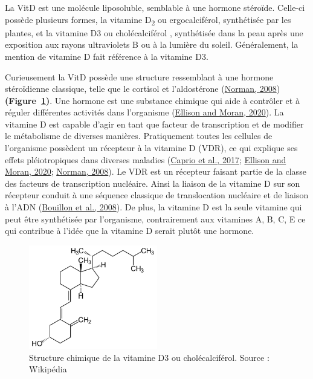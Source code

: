 \documentclass[
  letterpaper,
  DIV=11,
  numbers=noendperiod]{scrartcl}
\begin{document}
La VitD est une molécule liposoluble, semblable à une hormone stéroïde.
Celle-ci possède plusieurs formes, la vitamine D\textsubscript{2} ou
ergocalciférol, synthétisée par les plantes, et la vitamine D3 ou
cholécalciférol , synthétisée dans la peau après une exposition aux
rayons ultraviolets B ou à la lumière du soleil. Généralement, la
mention de vitamine D fait référence à la vitamine D3.

Curieusement la VitD possède une structure ressemblant à une hormone
stéroïdienne classique, telle que le cortisol et l'aldostérone
(\protect\hyperlink{ref-Norman.2008}{Norman, 2008})
\textbf{(Figure~\ref{fig-vitd3})}. Une hormone est une substance
chimique qui aide à contrôler et à réguler différentes activités dans
l'organisme (\protect\hyperlink{ref-Ellison.2020}{Ellison and Moran,
2020}). La vitamine D est capable d'agir en tant que facteur de
transcription et de modifier le métabolisme de diverses manières.
Pratiquement toutes les cellules de l'organisme possèdent un récepteur à
la vitamine D (VDR), ce qui explique ses effets pléiotropiques dans
diverses maladies (\protect\hyperlink{ref-Caprio.2017}{Caprio et al.,
2017}; \protect\hyperlink{ref-Ellison.2020}{Ellison and Moran, 2020};
\protect\hyperlink{ref-Norman.2008}{Norman, 2008}). Le VDR est un
récepteur faisant partie de la classe des facteurs de transcription
nucléaire. Ainsi la liaison de la vitamine D sur son récepteur conduit à
une séquence classique de translocation nucléaire et de liaison à l'ADN
(\protect\hyperlink{ref-Bouillon.2008}{Bouillon et al., 2008}). De plus,
la vitamine D est la seule vitamine qui peut être synthétisée par
l'organisme, contrairement aux vitamines A, B, C, E ce qui contribue à
l'idée que la vitamine D serait plutôt une hormone.

\begin{figure}

{\centering \includegraphics[width=0.5\textwidth,height=\textheight]{figures/vitamin-d3.png}

}

\caption{\label{fig-vitd3}Structure chimique de la vitamine D3 ou
cholécalciférol. Source : Wikipédia}

\end{figure}
\end{document}
